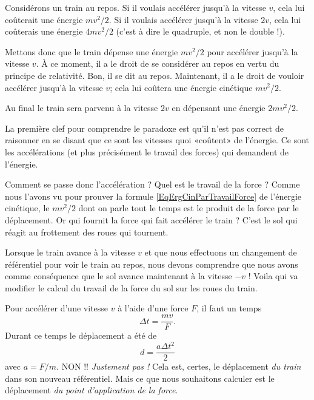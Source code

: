 \begin{probleme}
	Considérons un train au repos. Si il voulais accélérer jusqu'à la vitesse $v$, cela lui coûterait une énergie $mv^2/2$. Si il voulais accélérer jusqu'à la vitesse $2v$, cela lui coûterais une énergie $4mv^2/2$ (c'est à dire le quadruple, et non le double !).

	Mettons donc que le train dépense une énergie $mv^2/2$ pour accélérer jusqu'à la vitesse $v$. À ce moment, il a le droit de se considérer au repos en vertu du principe de relativité. Bon, il se dit au repos. Maintenant, il a le droit de vouloir accélérer jusqu'à la vitesse $v$; cela lui coûtera une énergie cinétique $mv^2/2$.

	Au final le train sera parvenu à la vitesse $2v$ en dépensant une énergie $2mv^2/2$.
\end{probleme}

La première clef pour comprendre le paradoxe est qu'il n'est pas correct de raisonner en se disant que ce sont les vitesses quoi «coûtent» de l'énergie. Ce sont les accélérations (et plus précisément le travail des forces) qui demandent de l'énergie.

Comment se passe donc l'accélération ? Quel est le travail de la force ? Comme nous l'avons vu pour prouver la formule \eqref{EqErgCinParTravailForce} de l'énergie cinétique, le $mv^2/2$ dont on parle tout le temps est le produit de la force par le déplacement. Or qui fournit la force qui fait accélérer le train ? C'est le sol qui réagit au frottement des roues qui tournent.

Lorsque le train avance à la vitesse $v$ et que nous effectuons un changement de référentiel pour voir le train au repos, nous devons comprendre que nous avons comme conséquence que le sol avance maintenant à la vitesse $-v$ ! Voila qui va modifier le calcul du travail de la force du sol sur les roues du train.

Pour accélérer d'une vitesse $v$ à l'aide d'une force $F$, il faut un temps
\begin{equation}
	\Delta t=\frac{ mv }{ F }.
\end{equation}
Durant ce temps le déplacement a été de
\begin{equation}
	d=\frac{ a\Delta t^2 }{ 2 }
\end{equation}
avec $a=F/m$. NON !! \emph{Justement pas !} Cela est, certes, le déplacement \emph{du train} dans son nouveau référentiel. Mais ce que nous souhaitons calculer est le déplacement \emph{du point d'application de la force}.

